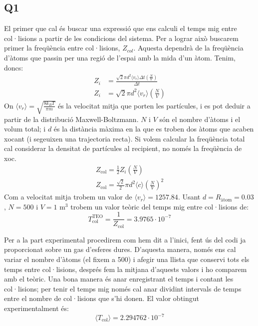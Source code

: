 \documentclass{article}
\begin{document}
	\subsection*{Q1}

	El primer que cal és buscar una expressió que ens calculi el temps mig entre col·lisions a partir de les condicions del sistema. Per a lograr això buscarem primer la freqüència entre col·lisions, $Z_{col}$. Aquesta dependrà de la freqüència d'àtoms que passin per una regió de l'espai amb la mida d'un àtom. Tenim, doncs:
	$$
	\begin{aligned}
		Z_i & =\frac{\sqrt{2} \pi d^2\langle v_r\rangle \Delta t\left(\frac{N}{V}\right)}{\Delta t} \\
		Z_i & =\sqrt{2} \pi d^2\langle v_r\rangle\left(\frac{N}{V}\right)
	\end{aligned}
	$$
	On $\langle v_r \rangle = \sqrt{\frac{8k_BT}{\pi m}}$ és la velocitat mitja que porten les partícules, i es pot deduir a partir de la distribució Maxwell-Boltzmann. $N$ i $V$ són el nombre d'àtoms i el volum total; i $d$ és la distància màxima en la que es troben dos àtoms que acaben xocant (i segeuixen una trajectoria recta). Si volem calcular la freqüència total cal considerar la densitat de partícules al recipient, no només la freqüència de xoc.
	$$
	\begin{gathered}
		Z_{\text{col}}=\frac{1}{2} Z_i\left(\frac{N}{V}\right) \\
		Z_{\text{col}}=\frac{\sqrt{2}}{2} \pi d^2\langle c\rangle\left(\frac{N}{V}\right)^2
	\end{gathered}
	$$
	Com a velocitat mitja trobem un valor de $\boxed{\langle v_r \rangle = 1257.84}$. Usant $d=R_{\text{àtom}} = 0.03$, $N=500$ i $V=1$ m$^3$ trobem un valor teòric del temps mig entre col·lisions de: 
	\begin{equation}
		\boxed{T_{\text{col}}^{\text{TEO}} = \frac{1}{Z_{\text{col}}} = 3.9765 \cdot 10^{-7}}
	\end{equation}
	
	
	
	\par Per a la part experimental procedirem com hem dit a l'inici, fent ús del codi ja proporcionat sobre un gas d'esferes dures. D'aquesta manera, només ens cal variar el nombre d'àtoms (el fixem a 500) i afegir una llista que conservi tots els temps entre col·lisions, després fem la mitjana d'aquests valors i ho comparem amb el teòric. Una bona manera és anar enregistrant el temps i contant les col·lisions; per tenir el temps mig només cal anar dividint intervals de temps entre el nombre de col·lisions que s'hi donen. El valor obtingut experimentalment és: 
	\begin{equation}
		\boxed{\langle T_{\text{col}}\rangle = 2.294762 \cdot 10^{-7}}
	\end{equation}
	 
\end{document}
